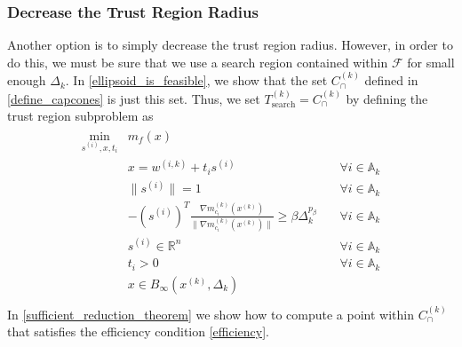 \documentclass{article}
\newenvironment{comment}
  {\par\medskip
   \color{red}%
   \begin{framed}
   \textbf{Comment: }\ignorespaces}
 {\end{framed}
  \medskip}
\theoremstyle{case}
\numberwithin{theorem}{subsection}
\newcommand{\activeconstraintsk}{{\mathbb A_{k}}}
\newcommand{\capcones}{{C^{(k)}_{\cap}}}
\newcommand{\dk}{\Delta_k}
\newcommand{\feasible}{{\mathcal F}}
\newcommand{\hgik}{{\frac{\nabla m^{(k)}_{c_i}(\xk)}{\|\nabla m^{(k)}_{c_i}\left(\xk\right)\|}}}
\newcommand{\Rn}{\mathbb R^n}
\newcommand{\searchtrk}{{T_{\text{search}}^{(k)}}}
\newcommand{\tr}{{ B_{\infty}\left(\xk, \dk\right) }}
\newcommand{\wik}{{w^{(i, k)}}}
\newcommand{\xk}{x^{(k)}}
\begin{document}



\subsubsection{Decrease the Trust Region Radius}
\label{decreasing_the_trust_region_for_infeasible_trial}

Another option is to simply decrease the trust region radius.
However, in order to do this, we must be sure that we use a search region contained within $\feasible$ for small enough $\dk$.
In \cref{ellipsoid_is_feasible}, we show that the set $\capcones$ defined in \cref{define_capcones} is just this set.
Thus, we set $\searchtrk = \capcones$ by defining the trust region subproblem as
\begin{align}
\label{capcones_tr_subproblem}
\begin{array}{ccc}
\min_{s^{(i)},x,t_i} & m_f(x) & \\
 & x = \wik + t _i s^{(i)} & \quad \forall i \in \activeconstraintsk \\
 & \|s^{(i)}\| = 1 & \quad \forall i \in \activeconstraintsk \\
 & -\left(s^{(i)}\right)^T\hgik \ge \beta \dk^{p_{\beta}} & \quad \forall i \in \activeconstraintsk \\
 & s^{(i)} \in \Rn  & \quad \forall i \in \activeconstraintsk \\
 & t_i > 0          & \quad \forall i \in \activeconstraintsk \\
 & x \in \tr		& \\
\end{array}
\end{align}
In \cref{sufficient_reduction_theorem} we show how to compute a point within $\capcones$ that satisfies the efficiency condition \cref{efficiency}.


\end{document}
